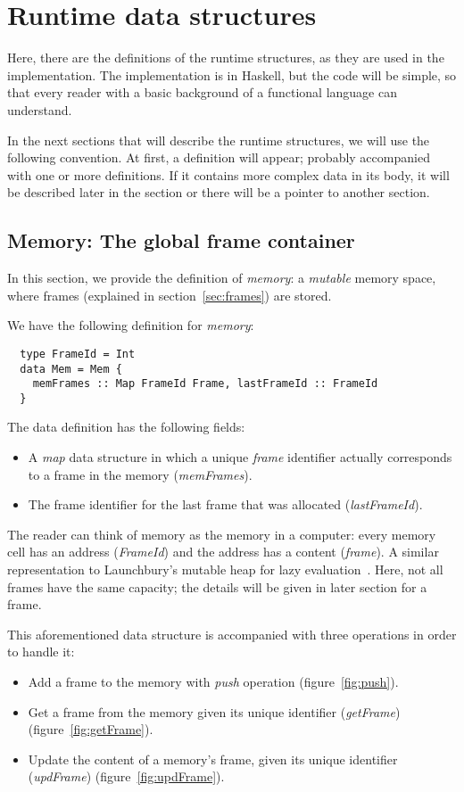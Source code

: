 \documentclass[diploma]{softlab-thesis}
\begin{document}
\section{Runtime data structures}
\label{sec:runtime-structs}
Here, there are the definitions of the runtime structures, as they are used in the implementation. The 
implementation is in Haskell, but the code will be simple, so that every reader with a basic background of a functional 
language can understand.

In the next sections that will describe the runtime structures, we will use the following convention. At first, a definition 
will appear; probably accompanied with one or more definitions. If it contains more complex data in its body, it will be 
described later in the section or there will be a pointer to another section.

\subsection{Memory: The global frame container}

In this section, we provide the definition of \textit{memory}: 
a \textit{mutable} memory space, where frames (explained in section~\ref{sec:frames}) are stored.

We have the following definition for \textit{memory}:
\begin{verbatim}
  type FrameId = Int
  data Mem = Mem {
    memFrames :: Map FrameId Frame, lastFrameId :: FrameId
  }
\end{verbatim}

The data definition has the following fields:
\begin{itemize}
  \item A \textit{map} data structure in which a unique \textit{frame} identifier actually corresponds to 
  a frame in the memory (\textit{memFrames}). 
  \item The frame identifier for the last frame that was allocated (\textit{lastFrameId}).
\end{itemize}

The reader can think of memory as the memory in a computer: every memory cell has an address (\textit{FrameId}) and 
the address has a content (\textit{frame}). A similar representation to Launchbury's mutable heap for 
lazy evaluation~\cite{La93}.
Here, not all frames have the same capacity; the details will be given in later section for a frame.

This aforementioned data structure is accompanied with three operations in order to handle it:
\begin{itemize}
  \item Add a frame to the memory with \textit{push} operation (figure~\ref{fig:push}).
  \item Get a frame from the memory given its unique identifier (\textit{getFrame})
  (figure~\ref{fig:getFrame}).
  \item Update the content of a memory's frame, given its unique identifier (\textit{updFrame})
  (figure~\ref{fig:updFrame}).
\end{itemize}
\end{document}
